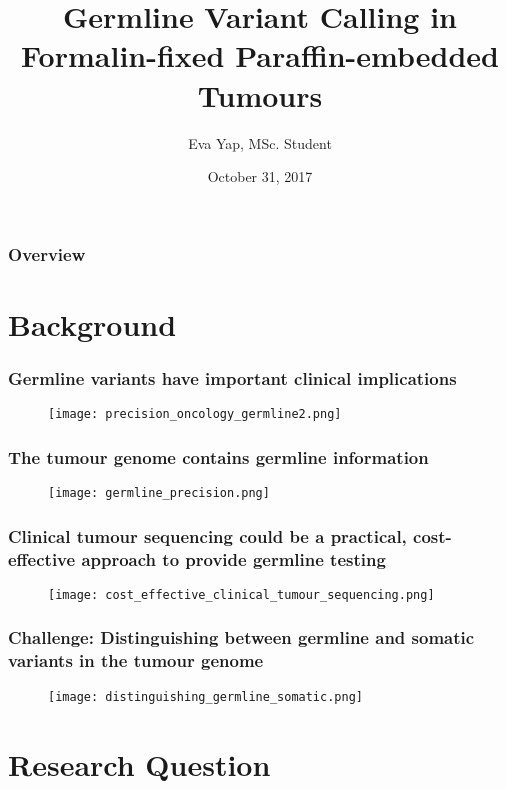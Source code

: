 \documentclass{beamer}
\title{Germline Variant Calling in Formalin-fixed Paraffin-embedded Tumours}
\author{Eva Yap, MSc. Student}
\date{October 31, 2017}
\begin{document}
\frame{\titlepage}

\begin{frame}
\frametitle{Overview}
\tableofcontents
\end{frame}


\section{Background}

\begin{frame}
\frametitle{Germline variants have important clinical implications}
\begin{figure}[t]
    \texttt{[image: precision\_oncology\_germline2.png]}
\end{figure}
\end{frame}

\begin{frame}
\frametitle{The tumour genome contains germline information}
\begin{figure}[t]
    \texttt{[image: germline\_precision.png]}
\end{figure}
\end{frame}

\begin{frame}
\frametitle{Clinical tumour sequencing could be a practical, cost-effective approach to provide germline testing}
\centering
\begin{figure}[t]
    \texttt{[image: cost\_effective\_clinical\_tumour\_sequencing.png]}
\end{figure}
\end{frame}

\begin{frame}
\frametitle{Challenge: Distinguishing between germline and somatic variants in the tumour genome}
\begin{figure}[t]
    \texttt{[image: distinguishing\_germline\_somatic.png]}
\end{figure}
\end{frame}

\section{Research Question}
\end{document}
